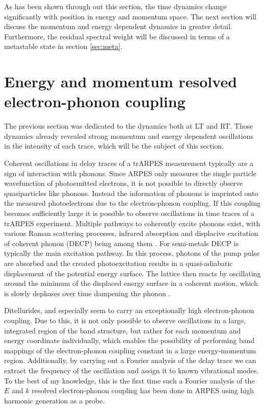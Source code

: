As has been shown through out this section, the time dynamics change significantly with position in energy and momentum space.
The next section will discuss the momentum and energy dependent dynamics in greater detail.
Furthermore, the residual spectral weight will be discussed in terms of a metastable state in section \ref{sec:meta}.

\section{Energy and momentum resolved electron-phonon coupling}
\label{sec:phonon_osc}

The previous section was dedicated to the dynamics both at LT and RT.
Those dynamics already revealed strong momentum and energy dependent oscillations in the intensity of each trace, which will be the subject of this section.

Coherent oscillations in delay traces of a trARPES measurement typically are a sign of interaction with phonons.
Since ARPES only measures the single particle wavefunction of photoemitted electrons, it is not possible to directly observe quasiparticles like phonons.
Instead the information of phonons is imprinted onto the measured photoelectrons due to the electron-phonon coupling.
If this coupling becomes sufficiently large it is possible to observe oscillations in time traces of a trARPES experiment.
Multiple pathways to coherently excite phonons exist, with various Raman scattering processes, infrared absorption and displacive excitation of coherent phonon (DECP) being among them \cite{zeiger_theory_1992, kuznetsov_theory_1994, giret_entropy_2011,juraschek_sum-frequency_2018,lakehal_microscopic_2019,caruso_quantum_2023, emeis_coherent_2024}.
For semi-metals DECP is typically the main excitation pathway.
In this process, photons of the pump pulse are absorbed and the created photoexcitation results in a quasi-adiabatic displacement of the potential energy surface.
The lattice then reacts by oscillating around the minimum of the displaced energy surface in a coherent motion, which is slowly dephases over time dampening the phonon \cite{zeiger_theory_1992, kuznetsov_theory_1994, bothschafter_ultrafast_2013, emeis_coherent_2024}.

Ditellurides, and especially  seem to carry an exceptionally high electron-phonon coupling.
Due to this, it is not only possible to observe oscillations in a large, integrated region of the band structure, but rather for each momentum and energy coordinate individually, which enables the possibility of performing band mappings of the electron-phonon coupling constant in a large energy-momentum region.
Additionally, by carrying out a Fourier analysis of the delay trace we can extract the frequency of the oscillation and assign it to known vibrational modes.
To the best of my knowledge, this is the first time such a Fourier analysis of the $E$ and $k$ resolved electron-phonon coupling has been done in ARPES using high harmonic generation as a probe.

